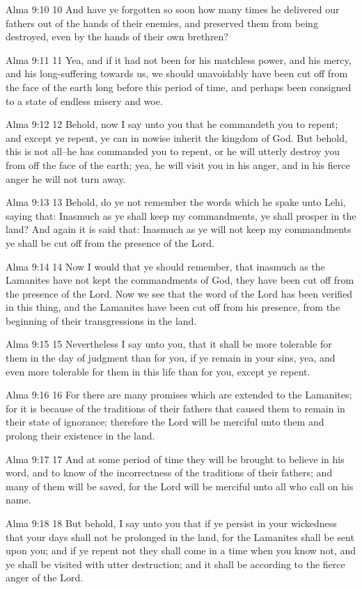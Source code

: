 Alma 9:10
 10 And have ye forgotten so soon how many times he delivered our
fathers out of the hands of their enemies, and preserved them
from being destroyed, even by the hands of their own brethren?

Alma 9:11
 11 Yea, and if it had not been for his matchless power, and his
mercy, and his long-suffering towards us, we should unavoidably
have been cut off from the face of the earth long before this
period of time, and perhaps been consigned to a state of endless
misery and woe.

Alma 9:12
 12 Behold, now I say unto you that he commandeth you to repent;
and except ye repent, ye can in nowise inherit the kingdom of
God. But behold, this is not all--he has commanded you to
repent, or he will utterly destroy you from off the face of the
earth; yea, he will visit you in his anger, and in his fierce
anger he will not turn away.

Alma 9:13
 13 Behold, do ye not remember the words which he spake unto
Lehi, saying that: Inasmuch as ye shall keep my commandments, ye
shall prosper in the land? And again it is said that: Inasmuch
as ye will not keep my commandments ye shall be cut off from the
presence of the Lord.

Alma 9:14
 14 Now I would that ye should remember, that inasmuch as the
Lamanites have not kept the commandments of God, they have been
cut off from the presence of the Lord. Now we see that the word
of the Lord has been verified in this thing, and the Lamanites
have been cut off from his presence, from the beginning of their
transgressions in the land.

Alma 9:15
 15 Nevertheless I say unto you, that it shall be more tolerable
for them in the day of judgment than for you, if ye remain in
your sins, yea, and even more tolerable for them in this life
than for you, except ye repent.

Alma 9:16
 16 For there are many promises which are extended to the
Lamanites; for it is because of the traditions of their fathers
that caused them to remain in their state of ignorance; therefore
the Lord will be merciful unto them and prolong their existence
in the land.

Alma 9:17
 17 And at some period of time they will be brought to believe in
his word, and to know of the incorrectness of the traditions of
their fathers; and many of them will be saved, for the Lord will
be merciful unto all who call on his name.

Alma 9:18
 18 But behold, I say unto you that if ye persist in your
wickedness that your days shall not be prolonged in the land, for
the Lamanites shall be sent upon you; and if ye repent not they
shall come in a time when you know not, and ye shall be visited
with utter destruction; and it shall be according to the fierce
anger of the Lord.

